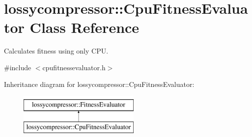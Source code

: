 \hypertarget{classlossycompressor_1_1_cpu_fitness_evaluator}{}\section{lossycompressor\+:\+:Cpu\+Fitness\+Evaluator Class Reference}
\label{classlossycompressor_1_1_cpu_fitness_evaluator}


Calculates fitness using only C\+PU.  




{\ttfamily \#include $<$cpufitnessevaluator.\+h$>$}

Inheritance diagram for lossycompressor\+:\+:Cpu\+Fitness\+Evaluator\+:\begin{figure}[H]
\begin{center}
\leavevmode
\includegraphics[height=2.000000cm]{classlossycompressor_1_1_cpu_fitness_evaluator}
\end{center}
\end{figure}
